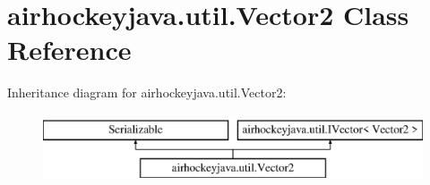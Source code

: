\hypertarget{classairhockeyjava_1_1util_1_1_vector2}{}\section{airhockeyjava.\+util.\+Vector2 Class Reference}
\label{classairhockeyjava_1_1util_1_1_vector2}
Inheritance diagram for airhockeyjava.\+util.\+Vector2\+:\begin{figure}[H]
\begin{center}
\leavevmode
\includegraphics[height=2.000000cm]{classairhockeyjava_1_1util_1_1_vector2}
\end{center}
\end{figure}
